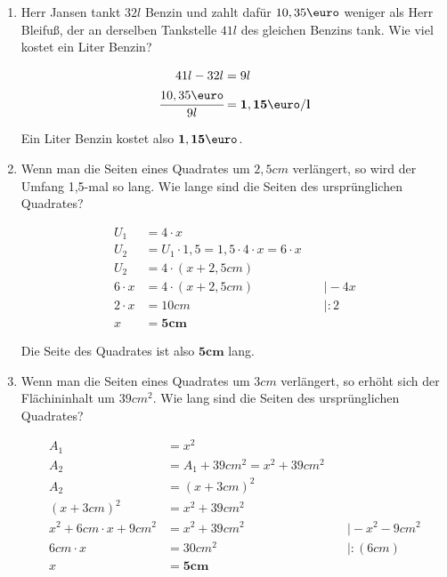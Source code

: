 \documentclass[a4paper,10pt]{article} %
\begin{document}
\begin{enumerate}
    Die Seite des Quadrates ist also \(\mathbf{8cm}\) lang.

  \item Herr Jansen tankt \(32l\) Benzin und zahlt dafür \(10,35\text{\euro}\)
    weniger als Herr Bleifuß, der an derselben Tankstelle \(41l\) des gleichen Benzins tank.
    Wie viel kostet ein Liter Benzin?

    \[
      \begin{aligned}
        41l - 32l &= 9l \\
        \cfrac{10,35\text{\euro}}{9l} &= \mathbf{1,15\text{\euro}/l}
      \end{aligned}
    \]

    Ein Liter Benzin kostet also \(\mathbf{1,15\text{\euro}}\).

  \item Wenn man die Seiten eines Quadrates um \(2,5cm\) verlängert, so wird der Umfang
    1,5-mal so lang. Wie lange sind die Seiten des ursprünglichen Quadrates?

    \[
      \begin{aligned}
        U_1 &= 4 \cdot x \\
        U_2 &= U_1 \cdot 1,5 = 1,5 \cdot 4 \cdot x = 6 \cdot x \\
        U_2 &= 4 \cdot (x + 2,5cm) \\
        6 \cdot x &= 4 \cdot (x + 2,5cm) &\quad\big| - 4x \\
        2 \cdot x &= 10cm &\quad\big| : 2 \\
        x &= \mathbf{5cm}
      \end{aligned}
    \]

    Die Seite des Quadrates ist also \(\mathbf{5cm}\) lang.

  \item Wenn man die Seiten eines Quadrates um \(3cm\) verlängert, so erhöht sich
    der Flächininhalt um \(39cm^2\). Wie lang sind die Seiten des ursprünglichen Quadrates?

    \[
      \begin{aligned}
        A_1 &= x^2 \\
        A_2 &= A_1 + 39cm^2 = x^2 + 39cm^2 \\
        A_2 &= (x + 3cm)^2 \\
        (x + 3cm)^2 &= x^2 + 39cm^2 \\
        x^2 + 6cm \cdot x + 9cm^2 &= x^2 + 39cm^2 &\quad\big| - x^2 - 9cm^2 \\
        6cm \cdot x &= 30cm^2 &\quad\big| : (6cm) \\
        x &= \mathbf{5cm}
      \end{aligned}
    \]


\end{enumerate}
\end{document}
